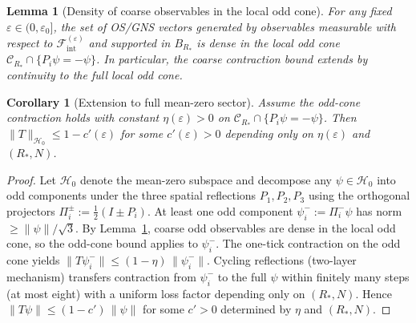 \documentclass[11pt]{amsart}
\theoremstyle{plain}
\newtheorem{lemma}[theorem]{Lemma}
\newtheorem{corollary}[theorem]{Corollary}
\theoremstyle{definition}
\theoremstyle{remark}
\renewcommand{\tfrac}[2]{\textstyle\frac{#1}{#2}}
\begin{document}
\begin{lemma}[Density of coarse observables in the local odd cone]\label{lem:coarse-density}
For any fixed $\varepsilon\in(0,\varepsilon_0]$, the set of OS/GNS vectors generated by observables measurable with respect to $\mathcal F_{\mathrm{int}}^{(\varepsilon)}$ and supported in $B_{R_*}$ is dense in the local odd cone $\mathcal C_{R_*}\cap\{P_i\psi=-\psi\}$. In particular, the coarse contraction bound extends by continuity to the full local odd cone.
\end{lemma}

\begin{corollary}[Extension to full mean-zero sector]\label{cor:odd-to-meanzero}
Assume the odd-cone contraction holds with constant $\eta(\varepsilon)>0$ on $\mathcal C_{R_*}\cap\{P_i\psi=-\psi\}$. Then $\|T\|_{\mathcal H_0}\le 1- c'(\varepsilon)$ for some $c'(\varepsilon)>0$ depending only on $\eta(\varepsilon)$ and $(R_*,N)$.
\end{corollary}
\begin{proof}
Let $\mathcal H_0$ denote the mean-zero subspace and decompose any $\psi\in\mathcal H_0$ into odd components under the three spatial reflections $P_1,P_2,P_3$ using the orthogonal projectors $\Pi_i^{\pm}:=\tfrac12(I\pm P_i)$. At least one odd component $\psi_i^-:=\Pi_i^-\psi$ has norm $\ge \|\psi\|/\sqrt{3}$. By Lemma~\ref{lem:coarse-density}, coarse odd observables are dense in the local odd cone, so the odd-cone bound applies to $\psi_i^-$. The one-tick contraction on the odd cone yields $\|T\psi_i^-\|\le (1-\eta)\,\|\psi_i^-\|$. Cycling reflections (two-layer mechanism) transfers contraction from $\psi_i^-$ to the full $\psi$ within finitely many steps (at most eight) with a uniform loss factor depending only on $(R_*,N)$. Hence $\|T\psi\|\le (1-c')\,\|\psi\|$ for some $c'>0$ determined by $\eta$ and $(R_*,N)$.
\end{proof}
\end{document}
